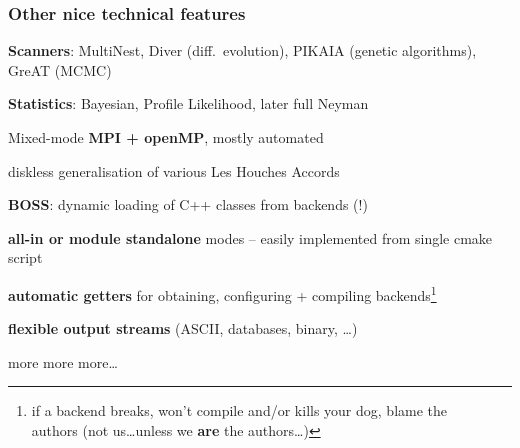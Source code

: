 \documentclass[xcolor=dvipsnames]{beamer}
\begin{document}
\begin{frame}
\frametitle{Other nice technical features}
\bi
\item \textbf{Scanners}: MultiNest, Diver (diff.\ evolution), PIKAIA (genetic algorithms), GreAT (MCMC)
\item \textbf{Statistics}: Bayesian, Profile Likelihood, later full Neyman
\item Mixed-mode \textbf{MPI + openMP}, mostly automated
\item diskless generalisation of various Les Houches Accords
\item \textbf{BOSS}: dynamic loading of C++ classes from backends (!)
\item \textbf{all-in or module standalone} modes -- easily implemented from single cmake script
\item \textbf{automatic getters} for obtaining, configuring + compiling backends\footnote{if a backend breaks, won't compile and/or kills your dog, blame the\\\protect{\hspace{5mm}} authors (not us\ldots unless we \textbf{are} the authors\ldots)}  
\item \textbf{flexible output streams} (ASCII, databases, binary, \ldots)
\item more more more\ldots
\ei
\end{frame}
\end{document}
